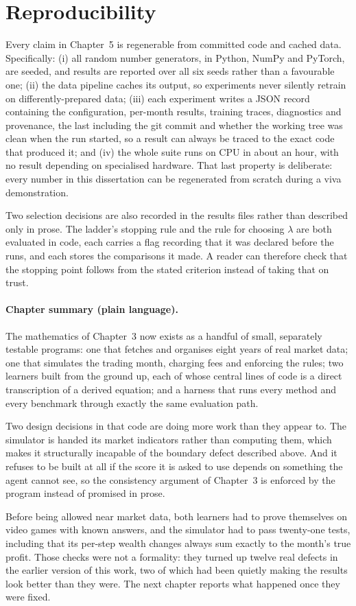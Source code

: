 \section{Reproducibility}
\label{sec:repro}

Every claim in Chapter~5 is regenerable from committed code and cached
data. Specifically: (i) all random number generators, in Python, NumPy and
PyTorch, are seeded, and results are reported over all six seeds rather than
a favourable one; (ii) the data pipeline caches its output, so experiments
never silently retrain on differently-prepared data; (iii) each experiment
writes a JSON record containing the configuration, per-month results,
training traces, diagnostics and provenance, the last including the git
commit and whether the working tree was clean when the run started, so a
result can always be traced to the exact code that produced it; and (iv) the
whole suite runs on CPU in about an hour, with no result depending on
specialised hardware. That last property is deliberate: every number in this
dissertation can be regenerated from scratch during a viva demonstration.

Two selection decisions are also recorded in the results files rather than
described only in prose. The ladder's stopping rule and the rule for
choosing $\lambda$ are both evaluated in code, each carries a flag
recording that it was declared before the runs, and each stores the
comparisons it made. A reader can therefore check that the stopping point
follows from the stated criterion instead of taking that on trust.

\paragraph{Chapter summary (plain language).} The mathematics of Chapter~3
now exists as a handful of small, separately testable programs: one that
fetches and organises eight years of real market data; one that simulates
the trading month, charging fees and enforcing the rules; two learners
built from the ground up, each of whose central lines of code is a direct
transcription of a derived equation; and a harness that runs every method
and every benchmark through exactly the same evaluation path.

Two design decisions in that code are doing more work than they appear to.
The simulator is handed its market indicators rather than computing them,
which makes it structurally incapable of the boundary defect described
above. And it refuses to be built at all if the score it is asked to use
depends on something the agent cannot see, so the consistency argument of
Chapter~3 is enforced by the program instead of promised in prose.

Before being allowed near market data, both learners had to prove
themselves on video games with known answers, and the simulator had to pass
twenty-one tests, including that its per-step wealth changes always sum
exactly to the month's true profit. Those checks were not a formality: they
turned up twelve real defects in the earlier version of this work, two of
which had been quietly making the results look better than they were. The
next chapter reports what happened once they were fixed.

